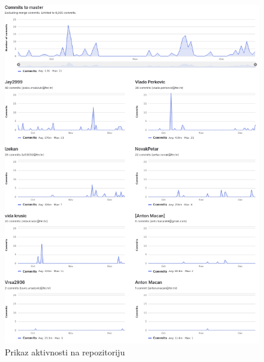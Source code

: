 		
		\begin{figure}[H]
			\includegraphics[width=\textwidth]{slike/commitovi.png} %
			\caption{Prikaz aktivnosti na repozitoriju}
			\label{fig:commitovi} %
			\end{figure}
		
	